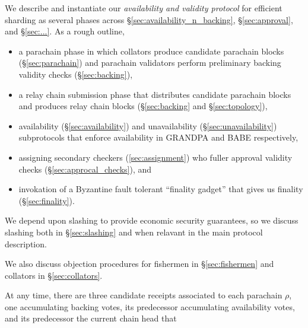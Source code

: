We describe and instantiate our {\em availability and validity protocol} for efficient sharding as several phases across \S\ref{sec:availability_n_backing}, \S\ref{sec:approval}, and \S\ref{sec:...}.  As a rough outline,
\begin{itemize}
\item a parachain phase in which collators produce candidate parachain blocks (\S\ref{sec:parachain}) and parachain validators perform preliminary backing validity checks (\S\ref{sec:backing}),
\item a relay chain submission phase that distributes candidate parachain blocks and produces relay chain blocks (\S\ref{sec:backing} and \S\ref{sec:topology}),
\item availability (\S\ref{sec:availability}) and unavailability (\S\ref{sec:unavailability}) subprotocols that enforce availability in GRANDPA and BABE respectively,
\item assigning secondary checkers (\ref{sec:assignment}) who fuller approval validity checks (\S\ref{sec:approcal_checks}), and
\item invokation of a Byzantine fault tolerant ``finality gadget'' that gives us finality (\S\ref{sec:finality}).
\end{itemize}
We depend upon slashing to provide economic security guarantees, so we discuss slashing both in \S\ref{sec:slashing} and when relavant in the main protocol description.

We also discuss objection procedures for fishermen in \S\ref{sec:fishermen} and collators in \S\ref{sec:collators}.







At any time, there are three candidate receipts associated to each parachain $\rho$, one accumulating backing votes, its predecessor accumulating availability votes, and its predecessor the current chain head that 



